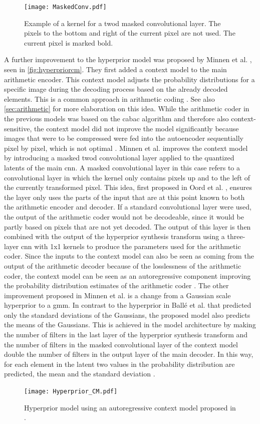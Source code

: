 \begin{figure}
\centering
\texttt{[image: MaskedConv.pdf]}
\caption[Example of Masked Convolutional Layer]{Example of a kernel for a \ac{twod} masked convolutional layer. The pixels to the bottom and right of the current pixel are not used. The current pixel is marked bold.}
\label{fig:maskedconv}
\end{figure}

A further improvement to the hyperprior model was proposed by Minnen et al. \citep{minnen_joint_2018}, seen in \autoref{fig:hyperpriorcm}. They first added a context model to the main arithmetic encoder. This context model adjusts the probability distributions for a specific image during the decoding process based on the already decoded elements. This is a common approach in arithmetic coding \citep{said_introduction_2023}. See also \autoref{sec:arithmetic} for more elaboration on this idea. While the arithmetic coder in the previous models was based on the \ac{cabac} algorithm and therefore also context-sensitive, the context model did not improve the model significantly because images that were to be compressed were fed into the autoencoder sequentially pixel by pixel, which is not optimal \citep{balle_end--end_2017}. Minnen et al. improves the context model by introducing a masked \ac{twod} convolutional layer applied to the quantized latents of the main \ac{cnn}. A masked convolutional layer in this case refers to a convolutional layer in which the kernel only contains pixels up and to the left of the currently transformed pixel. This idea, first proposed in Oord et al. \citep{oord_conditional_2016}, ensures the layer only uses the parts of the input that are at this point known to both the arithmetic encoder and decoder. If a standard convolutional layer were used, the output of the arithmetic coder would not be decodeable, since it would be partly based on pixels that are not yet decoded.  The output of this layer is then combined with the output of the hyperprior synthesis transform using a three-layer \ac{cnn} with 1x1 kernels to produce the parameters used for the arithmetic coder. Since the inputs to the context model can also be seen as coming from the output of the arithmetic decoder because of the losslessness of the arithmetic coder, the context model can be seen as an autoregressive component improving the probability distribution estimates of the arithmetic coder \citep{minnen_joint_2018}. The other improvement proposed in Minnen et al. \citep{minnen_joint_2018} is a change from a Gaussian scale hyperprior to a \ac{gmm}. In contrast to the hyperprior in Ballé et al. \citep{balle_variational_2018} that predicted only the standard deviations of the Gaussians, the proposed model also predicts the means of the Gaussians. This is achieved in the model architecture by making the number of filters in the last layer of the hyperprior synthesis transform and the number of filters in the masked convolutional layer of the context model double the number of filters in the output layer of the main decoder. In this way, for each element in the latent two values in the probability distribution are predicted, the mean and the standard deviation \citep{minnen_joint_2018}.

\begin{figure}
\centering
\texttt{[image: Hyperprior\_CM.pdf]}
\caption[Joint Hyperprior Architecture]{Hyperprior model using an autoregressive context model proposed in \citep{minnen_joint_2018}.}
\label{fig:hyperpriorcm}
\end{figure}
